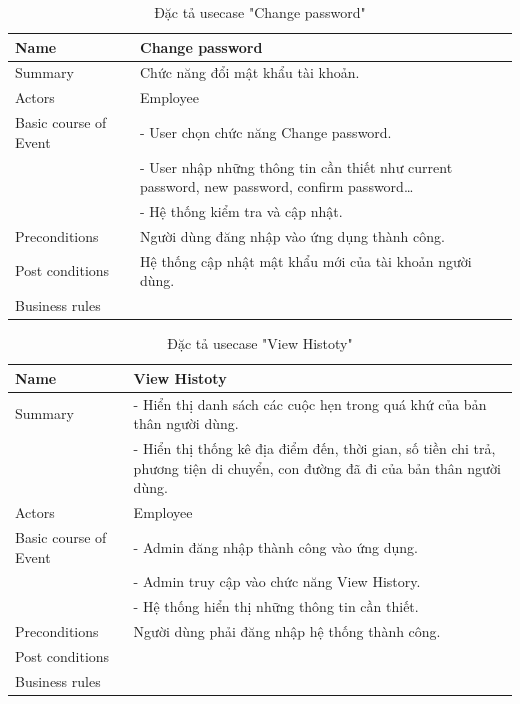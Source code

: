 \documentclass[a4paper]{article}
\begin{document}
\begin{table}[!h]
    \centering
    \begin{tabular}{|m{3.2cm}|m{10.5cm}|}
        \hline
        Name & Change password\\
        \hline
        Summary & Chức năng đổi mật khẩu tài khoản.\\
        \hline
        Actors & Employee\\
        \hline
        Basic course of Event & -	User chọn chức năng Change password.\\
&-	User nhập những thông tin cần thiết như current password, new password, confirm password…\\
&-	Hệ thống kiểm tra và cập nhật.\\
        \hline
        Preconditions & Người dùng đăng nhập vào ứng dụng thành công.\\
        \hline
        Post conditions & Hệ thống cập nhật mật khẩu mới của tài khoản người dùng.\\
        \hline
        Business rules & \\
        \hline
    \end{tabular}
    \caption{Đặc tả usecase "Change password"}
\end{table}
\begin{table}[!h]
    \centering
    \begin{tabular}{|m{3.2cm}|m{10.5cm}|}
        \hline
        Name & View Histoty\\
        \hline
        Summary & -	Hiển thị danh sách các cuộc hẹn trong quá khứ của bản thân người dùng.\\
&-	Hiển thị thống kê địa điểm đến, thời gian, số tiền chi trả, phương tiện di chuyển, con đường đã đi của bản thân người dùng.\\
        \hline
        Actors & Employee\\
        \hline
        Basic course of Event & -	Admin đăng nhập thành công vào ứng dụng.\\
&-	Admin truy cập vào chức năng View History.\\
&-	Hệ thống hiển thị những thông tin cần thiết.\\
        \hline
        Preconditions & Người dùng  phải đăng nhập hệ thống thành công.\\
        \hline
        Post conditions & \\
        \hline
        Business rules & \\
        \hline
    \end{tabular}
    \caption{Đặc tả usecase "View Histoty"}
\end{table}
\end{document}
